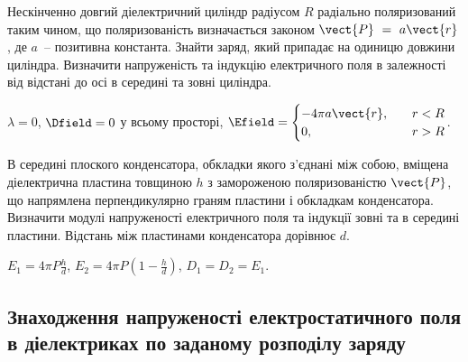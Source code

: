 \begin{problem}%
Нескінченно довгий діелектричний циліндр радіусом $R$ радіально поляризований таким чином, що поляризованість визначається законом $\vect{P}~=~a \vect{r}$, де $a$~-- позитивна константа. Знайти заряд, який припадає на одиницю довжини циліндра. Визначити напруженість та індукцію електричного поля в залежності від відстані до осі в середині та зовні циліндра.
\begin{solution}
	$\lambda = 0$,
	$\Dfield = 0$ у всьому просторі,
	$\Efield = %
		\begin{cases}
			- 4\pi  a  \vect{r}, & \quad r < R \\
			0,                              & \quad r > R
		\end{cases}
	$.
\end{solution}
\end{problem}

\begin{problem}
	В середині плоского конденсатора, обкладки якого з'єднані між собою, вміщена діелектрична пластина товщиною $h$ з замороженою поляризованістю $\vect{P}$, що напрямлена перпендикулярно граням пластини і обкладкам конденсатора. Визначити модулі напруженості електричного поля та індукції зовні та в середині пластини. Відстань між пластинами конденсатора дорівнює $d$.
	\begin{solution}
		$E_1 = 4\pi P\frac{h}{d}$, $E_2  =4\pi P \left( 1 - \frac{h}{d}\right) $, $D_1 = D_2 = E_1$.
	\end{solution}
\end{problem}

\subsection*{Знаходження напруженості електростатичного поля  в діелектриках по заданому розподілу заряду}


